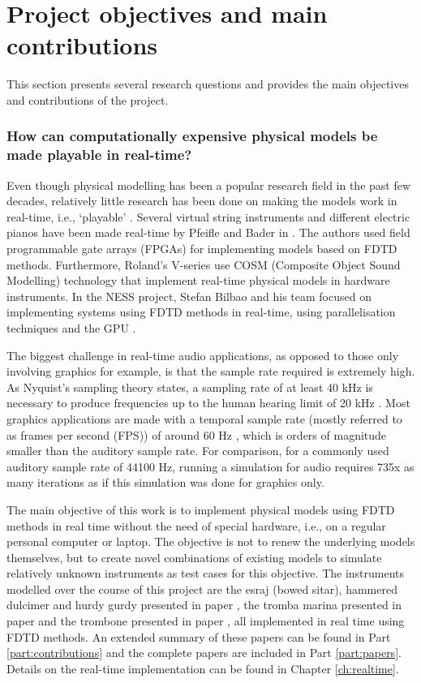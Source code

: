 \section{Project objectives and main contributions}\label{sec:objectivesContributions}
This section presents several research questions and provides the main objectives and contributions of the project. 

\subsubsection{How can computationally expensive physical models be made playable in real-time?}

Even though physical modelling has been a popular research field in the past few decades, relatively little research has been done on making the models work in real-time, i.e., `playable’ \cite{Mehes2016}. Several virtual string instruments and different electric pianos have been made real-time by Pfeifle and Bader in \cite{Pfeifle2012, Pfeifle2015, Pfeifle2017}. The authors used field programmable gate arrays (FPGAs) for implementing models based on FDTD methods. Furthermore, Roland’s V-series use COSM (Composite Object Sound Modelling) technology \cite{Bybee2019} that implement real-time physical models in hardware instruments. In the NESS project, Stefan Bilbao and his team focused on implementing systems using FDTD methods in real-time, using parallelisation techniques and the GPU \cite{Bilbao2019CMJa,Bilbao2019CMJb}. 


The biggest challenge in real-time audio applications, as opposed to those only involving graphics for example, is that the sample rate required is extremely high. As Nyquist's sampling theory states, a sampling rate of at least 40 kHz is necessary to produce frequencies up to the human hearing limit of 20 kHz \cite{Nyquist}. Most graphics applications are made with a temporal sample rate (mostly referred to as frames per second (FPS)) of around 60 Hz \cite{Yantis2016}, which is orders of magnitude smaller than the auditory sample rate. For comparison, for a commonly used auditory sample rate of 44100 Hz, running a simulation for audio requires 735x as many iterations as if this simulation was done for graphics only.  

The main objective of this work is to implement physical models using FDTD methods in real time without the need of special hardware, i.e., on a regular personal computer or laptop. The objective is not to renew the underlying models themselves, but to create novel combinations of existing models to simulate relatively unknown instruments as test cases for this objective. The instruments modelled over the course of this project are the esraj (bowed sitar), hammered dulcimer and hurdy gurdy presented in paper \citeP[A], the tromba marina presented in paper \citeP[D] and the trombone presented in paper \citeP[H], all implemented in real time using FDTD methods. An extended summary of these papers can be found in Part \ref{part:contributions} and the complete papers are included in Part \ref{part:papers}. Details on the real-time implementation can be found in Chapter \ref{ch:realtime}.

